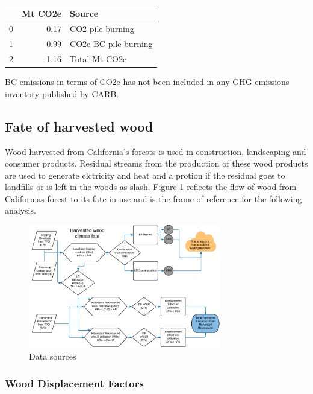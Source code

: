 \documentclass[a4paper]{article}
\begin{document}
\begin{center}
\begin{tabular}{rrl}
 & Mt CO2e & Source\\
\hline
0 & 0.17 & CO2 pile burning\\
1 & 0.99 & CO2e BC pile burning\\
2 & 1.16 & Total Mt CO2e\\
\end{tabular}

\end{center}

BC emissions in terms of CO2e has not been included in any GHG emissions
inventory published by CARB.

\subsection{Fate of harvested wood}
\label{sec:orgheadline11}
Wood harvested from California's forests is used in construction,
landscaping and consumer products. Residual streams from the production of these wood products are used to generate elctricity and heat and a protion if the residual goes to landfills or is left in the woods as slash. Figure \ref{fig:flow_chart} reflects the flow of wood from Californias forest to its fate in-use and is the frame of reference for the following analysis.

\begin{figure}[htb]
\centering
\includegraphics[width=0.75\textwidth]{./graphics/flow_chart.pdf}
\caption{Data sources \label{fig:flow_chart}}
\end{figure}

\subsubsection{Wood Displacement Factors}
\label{sec:orgheadline5}
\end{document}
